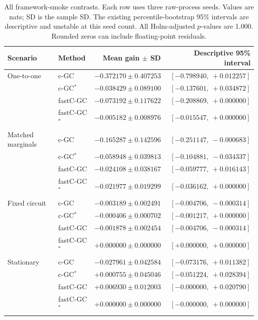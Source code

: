 \documentclass[11pt,a4paper]{article}
\newcommand{\cgc}{c-GC}
\newcommand{\cgcs}{c-GC$^{*}$}
\newcommand{\fastcgc}{fastC-GC}
\newcommand{\fastcgcs}{fastC-GC$^{*}$}
\begin{document}
\begin{table}[htbp]
\centering
\small
\setlength{\tabcolsep}{4pt}
\caption{All framework-smoke contrasts. Each row uses three raw-process seeds.
Values are nats; SD is the sample SD. The existing percentile-bootstrap 95\%
intervals are descriptive and unstable at this seed count. All Holm-adjusted
$p$-values are 1.000. Rounded zeros can include floating-point residuals.}
\label{tab:framework}
\begin{tabular}{@{}llrr@{}}
\toprule
Scenario & Method & Mean gain $\pm$ SD & Descriptive 95\% interval \\
\midrule
One-to-one & \cgc & $-0.372170 \pm 0.407253$ & $[-0.798940,\ +0.012257]$ \\
 & \cgcs & $-0.038429 \pm 0.089100$ & $[-0.137601,\ +0.034872]$ \\
 & \fastcgc & $-0.073192 \pm 0.117622$ & $[-0.208869,\ +0.000000]$ \\
 & \fastcgcs & $-0.005182 \pm 0.008976$ & $[-0.015547,\ +0.000000]$ \\
\midrule
Matched marginals & \cgc & $-0.165287 \pm 0.142596$ & $[-0.251147,\ -0.000683]$ \\
 & \cgcs & $-0.058948 \pm 0.039813$ & $[-0.104881,\ -0.034337]$ \\
 & \fastcgc & $-0.024108 \pm 0.038167$ & $[-0.059777,\ +0.016143]$ \\
 & \fastcgcs & $-0.021977 \pm 0.019299$ & $[-0.036162,\ +0.000000]$ \\
\midrule
Fixed circuit & \cgc & $-0.003189 \pm 0.002491$ & $[-0.004706,\ -0.000314]$ \\
 & \cgcs & $-0.000406 \pm 0.000702$ & $[-0.001217,\ +0.000000]$ \\
 & \fastcgc & $-0.001878 \pm 0.002454$ & $[-0.004706,\ -0.000314]$ \\
 & \fastcgcs & $+0.000000 \pm 0.000000$ & $[+0.000000,\ +0.000000]$ \\
\midrule
Stationary & \cgc & $-0.027961 \pm 0.042584$ & $[-0.073176,\ +0.011382]$ \\
 & \cgcs & $+0.000755 \pm 0.045046$ & $[-0.051224,\ +0.028394]$ \\
 & \fastcgc & $+0.006930 \pm 0.012003$ & $[-0.000000,\ +0.020790]$ \\
 & \fastcgcs & $+0.000000 \pm 0.000000$ & $[-0.000000,\ +0.000000]$ \\
\bottomrule
\end{tabular}
\end{table}
\end{document}
